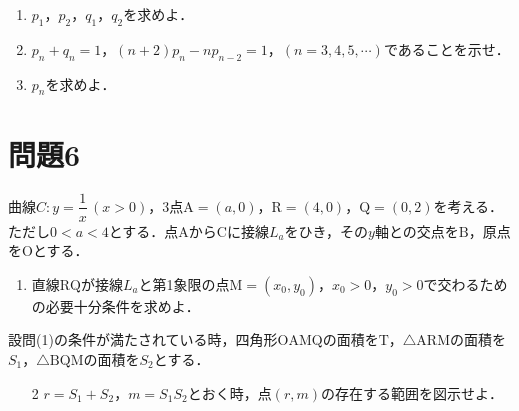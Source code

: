 \documentclass[unicode,12pt, A4j]{ltjsarticle}%
\begin{document}
\begin{enumerate}
 \item $p_1$，$p_2$，$q_1$，$q_2$を求めよ．
 \item $p_n+q_n=1$，$(n+2)p_n-np_{n-2}=1$，$(n=3,4,5,\cdots)$であることを示せ．
 \item $p_n$を求めよ．
\end{enumerate}

\section{問題6}
曲線$C:y=\dfrac{1}{x}\, (x>0)$，$3$点$\mathrm{A}=(a,0)$，$\mathrm{R}=(4,0)$，$\mathrm{Q}=(0,2)$を考える．ただし$0<a<4$とする．点$\mathrm{A}$から$\mathrm{C}$に接線$L_a$をひき，その$y$軸との交点を$\mathrm{B}$，原点を$\mathrm{O}$とする．
\begin{enumerate}
 \item 直線$\mathrm{RQ}$が接線$L_a$と第1象限の点$\mathrm{M}=(x_0,y_0)$，$x_0>0$，$y_0>0$で交わるための必要十分条件を求めよ．
\end{enumerate}
設問(1)の条件が満たされている時，四角形$\mathrm{OAMQ}$の面積を$\mathrm{T}$，$\triangle\mathrm{ARM}$の面積を$S_1$，$\triangle\mathrm{BQM}$の面積を$S_2$とする．
\begin{enumerate}
 \item[2] $r=S_1+S_2$，$m=S_1S_2$とおく時，点$(r,m)$の存在する範囲を図示せよ．
\end{enumerate}
\end{document}
